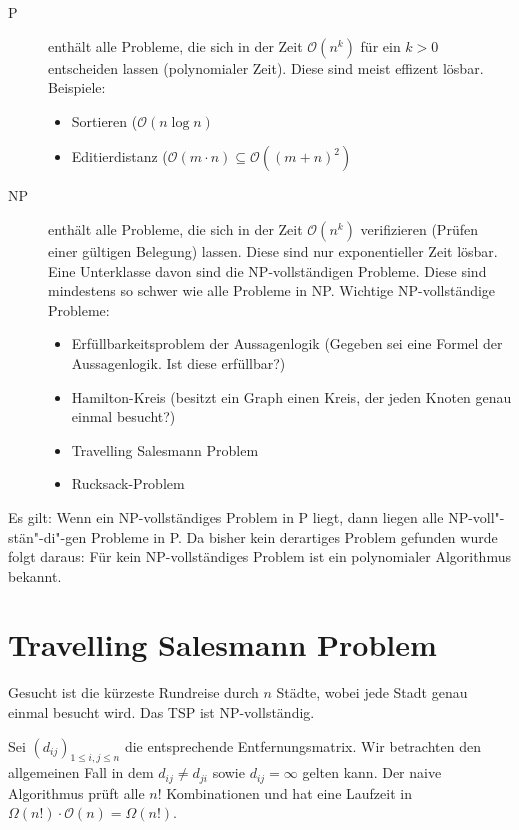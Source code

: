 \begin{description}
	\item[P] enthält alle Probleme, die sich in der Zeit \(\mathcal{O}(n^{k})\) für ein \(k>0\) entscheiden lassen (polynomialer Zeit).
		Diese sind meist effizent lösbar.
		Beispiele:
			\begin{itemize}
				\item Sortieren (\(\mathcal{O}(n \log n)\)
				\item Editierdistanz (\(\mathcal{O}(m \cdot n) \subseteq \mathcal{O}((m+n)^{2})\)
			\end{itemize}
	\item[NP] enthält alle Probleme, die sich in der Zeit \(\mathcal{O}(n^{k})\) verifizieren (Prüfen einer gültigen Belegung) lassen.
		Diese sind nur exponentieller Zeit lösbar.
		Eine Unterklasse davon sind die NP-vollständigen Probleme.
		Diese sind mindestens so schwer wie alle Probleme in NP.
		Wichtige NP-vollständige Probleme:
		\begin{itemize}
			\item Erfüllbarkeitsproblem der Aussagenlogik (Gegeben sei eine Formel der Aussagenlogik. Ist diese erfüllbar?)
			\item Hamilton-Kreis (besitzt ein Graph einen Kreis, der jeden Knoten genau einmal besucht?)
			\item Travelling Salesmann Problem
			\item Rucksack-Problem
		\end{itemize}
\end{description}
Es gilt: Wenn ein NP-vollständiges Problem in P liegt, dann liegen alle NP-voll"-stän"-di"-gen Probleme in P.
Da bisher kein derartiges Problem gefunden wurde folgt daraus: Für kein NP-vollständiges Problem ist ein polynomialer Algorithmus bekannt.


\section{Travelling Salesmann Problem}
\label{sec:TSP}
Gesucht ist die kürzeste Rundreise durch \(n\) Städte, wobei jede Stadt genau einmal besucht wird.
Das TSP ist NP-vollständig.

Sei \((d_{ij})_{1 \leq i, j \leq n}\) die entsprechende Entfernungsmatrix.
Wir betrachten den allgemeinen Fall in dem \(d_{ij} \neq d_{ji}\) sowie \(d_{ij} = \infty\) gelten kann.
Der naive Algorithmus prüft alle \(n!\) Kombinationen und hat eine Laufzeit in \(\Omega(n!) \cdot \mathcal{O}(n) = \Omega(n!)\).

